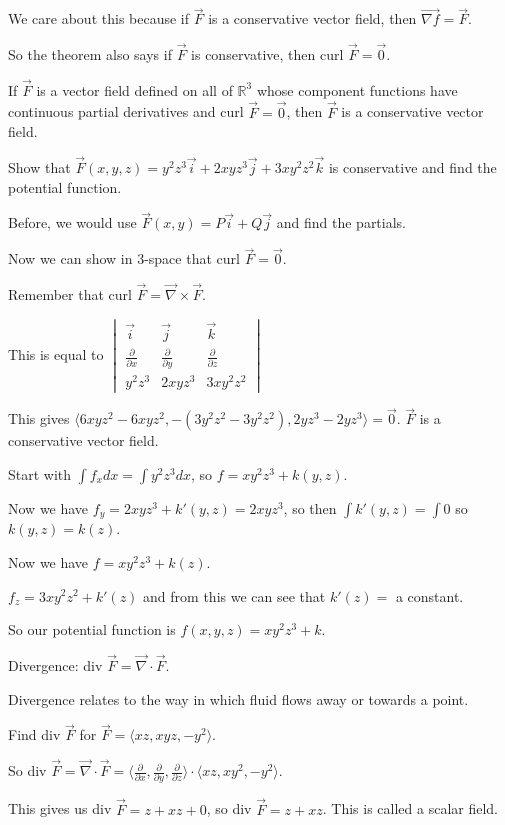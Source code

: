 \documentclass[../calc3.tex]{subfiles}
\begin{document}
We care about this because if $\vec{F}$ is a conservative vector field, then $\vec{\nabla f}=\vec{F}$.

So the theorem also says if $\vec{F}$ is conservative, then curl $\vec{F}=\vec{0}$.

\begin{theorem}
    If $\vec{F}$ is a vector field defined on all of $\mathbb{R}^3$ whose component functions have continuous partial derivatives and curl $\vec{F}=\vec{0}$, then $\vec{F}$ is a conservative vector field.
\end{theorem}

\begin{example}
    Show that $\vec{F}(x,y,z)=y^2z^3\vec{i}+2xyz^3\vec{j}+3xy^2z^2\vec{k}$ is conservative and find the potential function.

    Before, we would use $\vec{F}(x,y)=P\vec{i}+Q\vec{j}$ and find the partials.

    Now we can show in $3$-space that curl $\vec{F}=\vec{0}$.

    Remember that curl $\vec{F}=\vec{\nabla}\times \vec{F}$.

    This is equal to $\begin{vmatrix}
        \vec{i}&\vec{j}&\vec{k}\\
        \frac{\partial}{\partial x} & \frac{\partial}{\partial y} & \frac{\partial}{\partial z}\\
        y^2 z^3 & 2xyz^3 & 3xy^2z^2
    \end{vmatrix}$

    This gives $\langle 6xyz^2-6xyz^2, -(3y^2z^2-3y^2z^2), 2yz^3-2yz^3\rangle = \vec{0}$. $\vec{F}$ is a conservative vector field.

    Start with $\int f_x dx = \int y^2z^3 dx$, so $f=xy^2z^3+k(y,z)$.

    Now we have $f_y=2xyz^3+k'(y,z)=2xyz^3$, so then $\int k'(y,z)=\int 0$ so $k(y,z)=k(z)$.

    Now we have $f=xy^2z^3+k(z)$.

    $f_z=3xy^2z^2+k'(z)$ and from this we can see that $k'(z)=$ a constant.

    So our potential function is $f(x,y,z)=xy^2z^3+k$.
\end{example}

Divergence: div $\vec{F}=\vec{\nabla}\cdot \vec{F}$.

Divergence relates to the way in which fluid flows away or towards a point.

\begin{example}
    Find div $\vec{F}$ for $\vec{F}=\langle xz,xyz,-y^2\rangle$.

    So div $\vec{F}=\vec{\nabla}\cdot \vec{F}=\langle \frac{\partial}{\partial x}, \frac{\partial}{\partial y},\frac{\partial}{\partial z}\rangle \cdot \langle xz,xy^2,-y^2\rangle$.

    This gives us div $\vec{F}=z+xz+0$, so div $\vec{F}=z+xz$. This is called a scalar field.
\end{example}
\end{document}
